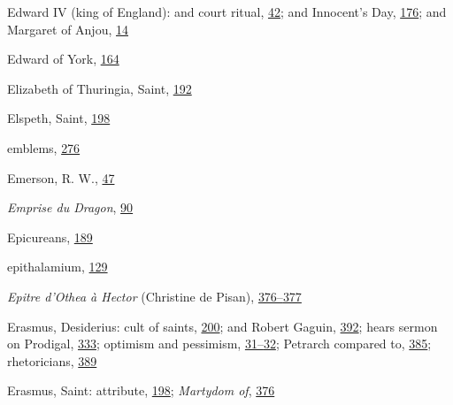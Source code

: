 Edward IV (king of England): and court ritual,
\protect\hyperlink{09_Chapter_Two__THE_CRAVING_FOR_A_M.xhtmlux5cux23page_42}{42};
and Innocent's Day,
\protect\hyperlink{13_Chapter_Six__THE_DEPICTION_OF_TH.xhtmlux5cux23page_176}{176};
and Margaret of Anjou,
\protect\hyperlink{08_Chapter_One__THE_PASSIONATE_INTE.xhtmlux5cux23page_14}{14}

Edward of York,
\protect\hyperlink{12_Chapter_Five__THE_VISION_OF_DEAT.xhtmlux5cux23page_164}{164}

Elizabeth of Thuringia, Saint,
\protect\hyperlink{13_Chapter_Six__THE_DEPICTION_OF_TH.xhtmlux5cux23page_192}{192}

Elspeth, Saint,
\protect\hyperlink{13_Chapter_Six__THE_DEPICTION_OF_TH.xhtmlux5cux23page_198}{198}

emblems,
\protect\hyperlink{18_Chapter_Eleven__THE_FORMS_OF_THO.xhtmlux5cux23page_276}{276}

Emerson, R. W.,
\protect\hyperlink{09_Chapter_Two__THE_CRAVING_FOR_A_M.xhtmlux5cux23page_47}{47}

\emph{Emprise du Dragon},
\protect\hyperlink{10_Chapter_Three__THE_HEROIC_DREAM.xhtmlux5cux23page_90}{90}

Epicureans,
\protect\hyperlink{13_Chapter_Six__THE_DEPICTION_OF_TH.xhtmlux5cux23page_189}{189}

epithalamium,
\protect\hyperlink{11_Chapter_Four__THE_FORMS_OF_LOVE.xhtmlux5cux23page_129}{129}

\emph{Epitre d'Othea à Hector} (Christine de Pisan),
\protect\hyperlink{21_Chapter_Thirteen__IMAGE_AND_WORD.xhtmlux5cux23page_376}{376--}\protect\hyperlink{21_Chapter_Thirteen__IMAGE_AND_WORD.xhtmlux5cux23page_377}{377}

Erasmus, Desiderius: cult of saints,
\protect\hyperlink{13_Chapter_Six__THE_DEPICTION_OF_TH.xhtmlux5cux23page_200}{200};
and Robert Gaguin,
\protect\hyperlink{22_Chapter_Fourteen__THE_COMING_OF.xhtmlux5cux23page_392}{392};
hears sermon on Prodigal,
\protect\hyperlink{21_Chapter_Thirteen__IMAGE_AND_WORD.xhtmlux5cux23page_333}{333};
optimism and pessimism,
\protect\hyperlink{09_Chapter_Two__THE_CRAVING_FOR_A_M.xhtmlux5cux23page_31}{31--}\protect\hyperlink{09_Chapter_Two__THE_CRAVING_FOR_A_M.xhtmlux5cux23page_32}{32};
Petrarch compared to,
\protect\hyperlink{22_Chapter_Fourteen__THE_COMING_OF.xhtmlux5cux23page_385}{385};
rhetoricians,
\protect\hyperlink{22_Chapter_Fourteen__THE_COMING_OF.xhtmlux5cux23page_389}{389}

Erasmus, Saint: attribute,
\protect\hyperlink{13_Chapter_Six__THE_DEPICTION_OF_TH.xhtmlux5cux23page_198}{198};
\emph{Martydom of},
\protect\hyperlink{21_Chapter_Thirteen__IMAGE_AND_WORD.xhtmlux5cux23page_376}{376}


